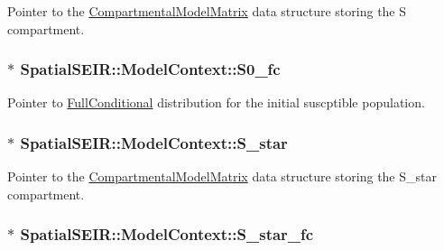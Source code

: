 Pointer to the \hyperlink{classSpatialSEIR_1_1CompartmentalModelMatrix}{Compartmental\-Model\-Matrix} data structure storing the S compartment. \hypertarget{classSpatialSEIR_1_1ModelContext_ab45d23e96fb44d1758dc73ea1a11629f}{
\subsubsection[{S0\-\_\-fc}]{$\ast$ Spatial\-S\-E\-I\-R\-::\-Model\-Context\-::\-S0\-\_\-fc}}\label{classSpatialSEIR_1_1ModelContext_ab45d23e96fb44d1758dc73ea1a11629f}
Pointer to \hyperlink{classSpatialSEIR_1_1FullConditional}{Full\-Conditional} distribution for the initial suscptible population. \hypertarget{classSpatialSEIR_1_1ModelContext_a6fce6827d821ab06e57abe08e6f6c4cb}{
\subsubsection[{S\-\_\-star}]{$\ast$ Spatial\-S\-E\-I\-R\-::\-Model\-Context\-::\-S\-\_\-star}}\label{classSpatialSEIR_1_1ModelContext_a6fce6827d821ab06e57abe08e6f6c4cb}
Pointer to the \hyperlink{classSpatialSEIR_1_1CompartmentalModelMatrix}{Compartmental\-Model\-Matrix} data structure storing the S\-\_\-star compartment. \hypertarget{classSpatialSEIR_1_1ModelContext_adeacc82667f794bca82d60daeb03cd9d}{
\subsubsection[{S\-\_\-star\-\_\-fc}]{$\ast$ Spatial\-S\-E\-I\-R\-::\-Model\-Context\-::\-S\-\_\-star\-\_\-fc}}\label{classSpatialSEIR_1_1ModelContext_adeacc82667f794bca82d60daeb03cd9d}
